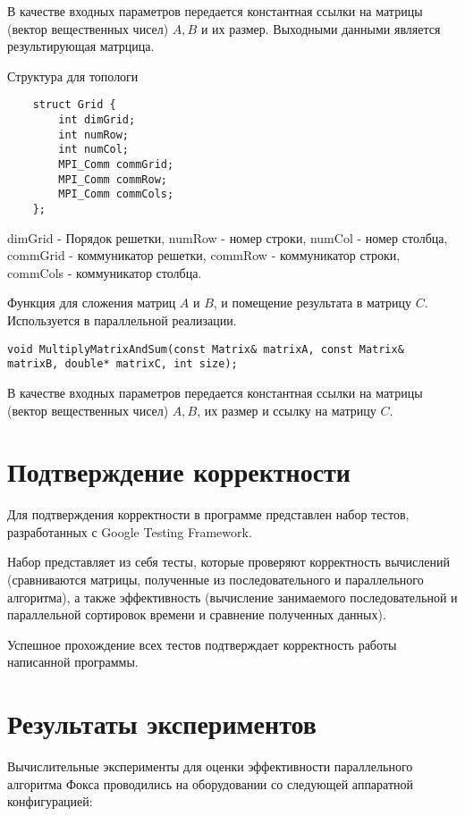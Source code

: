 \documentclass{report}
\begin{document}
\par В качестве входных параметров передается константная ссылки на матрицы (вектор вещественных чисел) {\itshape $A, B$} и их размер. Выходными данными является результирующая матрцица.
\par Структура для топологи
\begin{lstlisting}
    struct Grid {
        int dimGrid;
        int numRow;
        int numCol;
        MPI_Comm commGrid;
        MPI_Comm commRow;
        MPI_Comm commCols;
    };
\end{lstlisting}
\par dimGrid - Порядок решетки, numRow - номер строки, numCol - номер столбца, commGrid - коммуникатор решетки, commRow - коммуникатор строки, commCols - коммуникатор столбца.
\par Функция для сложения матриц {\itshape $A$} и {\itshape $B$}, и помещение результата в матрицу {\itshape $C$}. Используется в параллельной реализации.
\begin{lstlisting}
void MultiplyMatrixAndSum(const Matrix& matrixA, const Matrix& matrixB, double* matrixC, int size);
\end{lstlisting}
\par В качестве входных параметров передается константная ссылки на матрицы (вектор вещественных чисел) {\itshape $A, B$}, их размер и ссылку на матрицу {\itshape $C$}.
\newpage

\section*{Подтверждение корректности}
Для подтверждения корректности в программе представлен набор тестов, разработанных с Google Testing Framework.
\par Набор представляет из себя тесты, которые проверяют корректность вычислений (сравниваются матрицы, полученные из последовательного и параллельного алгоритма), а также эффективность (вычисление занимаемого последовательной и параллельной сортировок времени и сравнение полученных данных).
\par Успешное прохождение всех тестов подтверждает корректность работы написанной программы.
\newpage

\section*{Результаты экспериментов}
Вычислительные эксперименты для оценки эффективности параллельного алгоритма Фокса проводились на оборудовании со следующей аппаратной конфигурацией:
\end{document}
